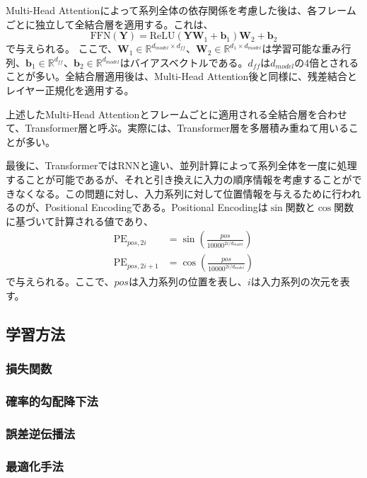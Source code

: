 \documentclass[12pt]{jarticle}
\numberwithin{equation}{section}    %
\numberwithin{figure}{section}      %
\numberwithin{table}{section}      %
\begin{document}
Multi-Head Attentionによって系列全体の依存関係を考慮した後は、各フレームごとに独立して全結合層を適用する。これは、
\begin{equation}
    \text{FFN}(\bm{Y}) = \text{ReLU}(\bm{Y}\bm{W}_{1} + \bm{b}_{1})\bm{W}_{2} + \bm{b}_{2}
\end{equation}
で与えられる。
ここで、$\bm{W}_{1} \in \mathbb{R}^{d_{model} \times d_{ff}}$、$\bm{W}_{2} \in \mathbb{R}^{d_{1} \times d_{model}}$は学習可能な重み行列、$\bm{b}_{1} \in \mathbb{R}^{d_{ff}}$、$\bm{b}_{2} \in \mathbb{R}^{d_{model}}$はバイアスベクトルである。$d_{ff}$は$d_{model}$の4倍とされることが多い。全結合層適用後は、Multi-Head Attention後と同様に、残差結合とレイヤー正規化を適用する。

上述したMulti-Head Attentionとフレームごとに適用される全結合層を合わせて、Transformer層と呼ぶ。実際には、Transformer層を多層積み重ねて用いることが多い。

最後に、TransformerではRNNと違い、並列計算によって系列全体を一度に処理することが可能であるが、それと引き換えに入力の順序情報を考慮することができなくなる。この問題に対し、入力系列に対して位置情報を与えるために行われるのが、Positional Encodingである。Positional Encodingは$\sin$関数と$\cos$関数に基づいて計算される値であり、
\begin{align}
    \text{PE}_{pos, 2i}     & = \sin \left(\frac{pos}{10000^{2i / d_{model}}}\right) \\
    \text{PE}_{pos, 2i + 1} & = \cos \left(\frac{pos}{10000^{2i / d_{model}}}\right)
\end{align}
で与えられる。ここで、$pos$は入力系列の位置を表し、$i$は入力系列の次元を表す。

\subsection{学習方法}
\subsubsection{損失関数}

\subsubsection{確率的勾配降下法}
\subsubsection{誤差逆伝播法}
\subsubsection{最適化手法}
\end{document}
